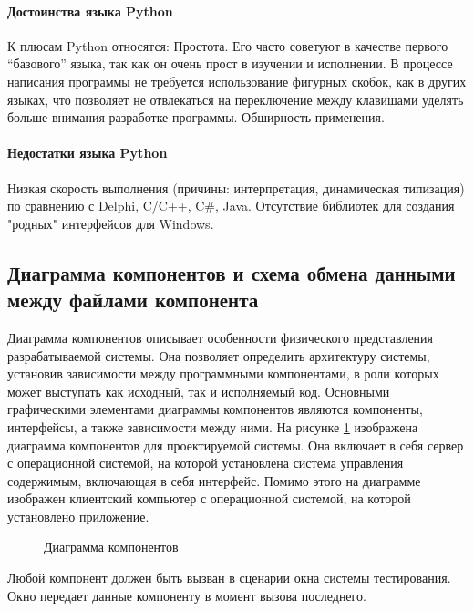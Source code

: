 \paragraph{Достоинства языка Python}

К плюсам Python относятся: Простота. Его часто советуют в качестве первого “базового” языка, так как он очень прост в изучении и исполнении. В процессе написания программы не требуется использование фигурных скобок, как в других языках, что позволяет не отвлекаться на переключение между клавишами уделять больше внимания разработке программы. Обширность применения.

\paragraph{Недостатки языка Python}

Низкая скорость выполнения (причины: интерпретация, динамическая типизация) по сравнению с Delphi, C/C++, C#, Java.
Отсутствие библиотек для создания "родных" интерфейсов для Windows.

\subsection{Диаграмма компонентов и схема обмена данными между файлами компонента}

Диаграмма компонентов описывает особенности физического представления разрабатываемой системы. Она позволяет определить архитектуру системы, установив зависимости между программными компонентами, в роли которых может выступать как исходный, так и исполняемый код. Основными графическими элементами диаграммы компонентов являются компоненты, интерфейсы, а также зависимости между ними. На рисунке \ref{system_template:image} изображена диаграмма компонентов для проектируемой системы. Она включает в себя сервер с операционной системой, на которой установлена система управления содержимым, включающая в себя интерфейс. Помимо этого на диаграмме изображен клиентский компьютер с операционной системой, на которой установлено приложение.

\begin{figure}[ht]
\caption{Диаграмма компонентов}
\label{system_template:image}
\end{figure}

Любой компонент должен быть вызван в сценарии окна системы тестирования. Окно передает данные компоненту в момент вызова последнего.


